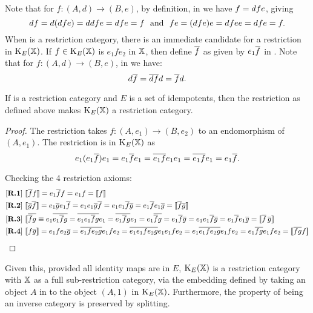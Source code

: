 Note that for $f:(A,d)\to(B,e)$, by definition, in \X we have $f=d\hspace{0.1pt} f e$, giving
\[d\hspace{0.1pt} f = d(d\hspace{0.1pt} f e) = d\hspace{0.1pt} d\hspace{0.1pt} f e = d\hspace{0.1pt} f e =f\ \text{ and }\  f e = (d\hspace{0.1pt} f e)e = d\hspace{0.1pt} f e\hspace{0.1pt} e = d\hspace{0.1pt} f e = f.\]
When \X is a restriction category, there is an immediate candidate
for a restriction in
$\text{K}_{E}(\mathbb{X})$. If $f\in\text{K}_{E}(\mathbb{X})$
is $e_1 f e_2$ in $\mathbb{X}$, then define $\overline{f}$ as given by $e_1 \overline{f}$ in \X. Note that
for $f:(A,d)\to(B,e)$, in \X we have:
\[d\hspace{0.1pt}\overline{f} = \overline{d\hspace{0.1pt} f} d = \overline{f} d.\]
\begin{proposition}\label{prop:spleisarestrictioncat}
If \X is a restriction category and $E$ is a set of idempotents, then
the restriction as defined above makes $\text{K}_{E}(\mathbb{X})$ a restriction category.
\end{proposition}
\begin{proof}
The restriction takes $f:(A,e_1)\to (B,e_2)$ to an endomorphism of $(A,e_1)$. The restriction is in
$\text{K}_{E}(\mathbb{X})$ as
\[e_1 (e_1\overline{f}) e_1 = e_1 \overline{f} e_1
= \overline{e_1 f} e_1 e_1
= \overline{e_1 f} e_1
= e_1 \overline{ f}.\]

Checking the 4 restriction axioms:
\begin{align*}
&[\text{{\bfseries R.1}}]\  \llbracket\overline{f}f\rrbracket = e_1 \overline{f} f
= e_1 f = \llbracket f\rrbracket\\
&[\text{{\textbf{R.2}}}]\ \llbracket\overline{g}\overline{f}\rrbracket =
e_1\overline{g}  e_1\overline{f}
= e_1 e_1\overline{g}  \overline{f} = e_1 e_1\overline{f}  \overline{g}
= e_1\overline{f}  e_1\overline{g}  = \llbracket\overline{f}\overline{g}\rrbracket\\
&[\text{{\textbf{R.3}}}]\ \llbracket\overline{\overline{f} g } \equiv
e_1 \overline{e_1 \overline{f}  g}
=  \overline{e_1 e_1 \overline{f} g} e_1
=  \overline{e_1 \overline{f} g} e_1
=  e_1 \overline{\overline{f} g}
= e_1 \overline{f}\overline{g}
= e_{1}e_{1}\overline{f}\overline{g}
= e_1 \overline{f}e_1\overline{g}
= \llbracket\overline{f}\, \overline{g}\rrbracket\\
&[\text{{\textbf{R.4}}}]\  \llbracket f \overline{g} \rrbracket =
 e_1f e_2 \overline{g}
= \overline{e_1 f e_2 g} e_1 f e_2
= \overline{e_1 e_1 f e_2 g} e_1 e_1 f e_2
= e_1 \overline{ e_1 f e_2 g} e_1 f e_2
= e_1 \overline{f g} e_1 f e_2
= \llbracket\overline{f g} f\rrbracket
\end{align*}
\end{proof}

Given this, provided all identity maps are in $E$, $\text{K}_{E}(\mathbb{X})$ is a
restriction category with $\mathbb{X}$ as a full sub-restriction category, via
the embedding defined by taking an object $A$ in \X to
the object $(A,1)$ in $\text{K}_{E}(\mathbb{X})$.  Furthermore, the property of being
an inverse category is preserved by splitting.

